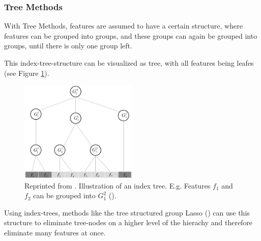 \subsubsection{Tree Methods}
\label{sec:methods.structured.tree}


With Tree Methods, features are assumed to have a certain structure, where
features can be grouped into groups, and these groups can again be grouped into
groups, until there is only one group left.

This index-tree-structure can be visualized as tree, with all features being
leafes (see Figure \ref{fig:methods.structured.tree.lasso}).

\begin{figure}[!ht]
  \centering 
  \includegraphics[width=0.5\textwidth]{chapters/methods/structured/tree_lasso}
  \caption{Reprinted from \cite{Tang:14}. Illustration of an index tree.
  E.g. Features $f_1$ and $f_2$ can be grouped into $G_1^2$ (\cite{Tang:14}).}
  \label{fig:methods.structured.tree.lasso}
\end{figure}

Using index-trees, methods like the tree structured group Lasso (\cite{Kim:10})
can use this structure to eliminate tree-nodes on a higher level of the hierachy and
therefore eliminate many features at once.